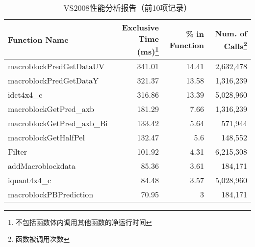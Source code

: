 \begin{table}[htbp]
  \centering
  \begin{minipage}[t]{\linewidth}
  \caption{VS2008性能分析报告（前10项记录）}
  \label{tab:vs10}
    \begin{tabular}{lrrr}
    \addlinespace
    \toprule[1.5pt]
    \textbf{Function Name} & \textbf{Exclusive Time (ms)\footnote{不包括函数体内调用其他函数的净运行时间}} & \textbf{\% in Function} & \textbf{Num. of Calls\footnote{函数被调用次数}} \\
    \midrule[1pt]
    macroblockPredGetDataUV & 341.01 & 14.41 & 2,632,478 \\
    macroblockPredGetDataY & 321.37 & 13.58 & 1,316,239 \\
    idct4x4\_c & 316.86 & 13.39 & 5,028,960 \\
    macroblockGetPred\_axb & 181.29 & 7.66  & 1,316,239 \\
    macroblockGetPred\_axb\_Bi & 133.42 & 5.64  & 571,944 \\
    macroblockGetHalfPel & 132.47 & 5.6   & 148,552 \\
    Filter & 101.92 & 4.31  & 6,215,308 \\
    addMacroblockdata & 85.36 & 3.61  & 184,171 \\
    iquant4x4\_c & 84.48 & 3.57  & 5,028,960 \\
    macroblockPBPrediction & 70.95 & 3     & 184,171 \\
    \bottomrule[1.5pt]
    \end{tabular}
  \end{minipage}
\end{table}

